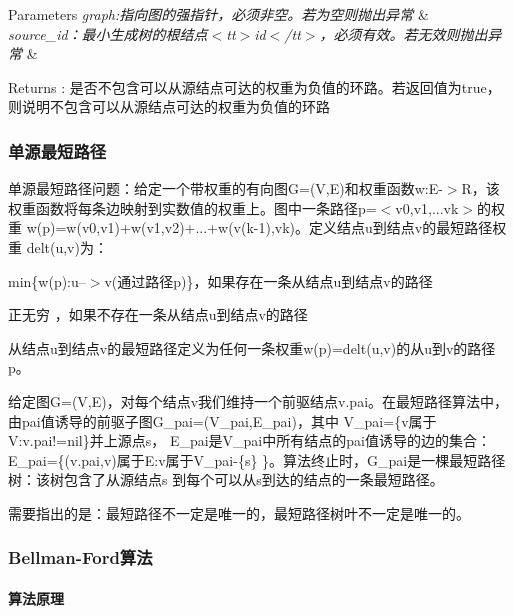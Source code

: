 \begin{DoxyParams}{Parameters}
{\em graph\+:指向图的强指针，必须非空。若为空则抛出异常} & \\
\hline
{\em source\+\_\+id：最小生成树的根结点$<$tt$>$id$<$/tt$>$，必须有效。若无效则抛出异常} & \\
\hline
\end{DoxyParams}
\begin{DoxyReturn}{Returns}
\+: 是否不包含可以从源结点可达的权重为负值的环路。若返回值为true，则说明不包含可以从源结点可达的权重为负值的环路
\end{DoxyReturn}
\subsubsection*{单源最短路径}

单源最短路径问题：给定一个带权重的有向图\+G=(V,E)和权重函数w\+:E-\/$>$R，该权重函数将每条边映射到实数值的权重上。图中一条路径p=$<$v0,v1,...vk$>$的权重 w(p)=w(v0,v1)+w(v1,v2)+...+w(v(k-\/1),vk)。定义结点u到结点v的最短路径权重 delt(u,v)为：


\begin{DoxyItemize}
\item min\{w(p)\+:u--$>$v(通过路径p)\}，如果存在一条从结点u到结点v的路径
\item 正无穷 ，如果不存在一条从结点u到结点v的路径
\end{DoxyItemize}

从结点u到结点v的最短路径定义为任何一条权重w(p)=delt(u,v)的从u到v的路径p。

给定图\+G=(V,E)，对每个结点v我们维持一个前驱结点v.\+pai。在最短路径算法中，由pai值诱导的前驱子图\+G\+\_\+pai=(V\+\_\+pai,E\+\_\+pai)，其中 V\+\_\+pai=\{v属于\+V\+:v.\+pai!=nil\}并上源点s， E\+\_\+pai是\+V\+\_\+pai中所有结点的pai值诱导的边的集合：\+E\+\_\+pai=\{(v.\+pai,v)属于\+E\+:v属于\+V\+\_\+pai-\/\{s\} \}。算法终止时，\+G\+\_\+pai是一棵最短路径树：该树包含了从源结点s 到每个可以从s到达的结点的一条最短路径。

需要指出的是：最短路径不一定是唯一的，最短路径树叶不一定是唯一的。

\subsubsection*{Bellman-\/\+Ford算法}

\paragraph*{算法原理}


